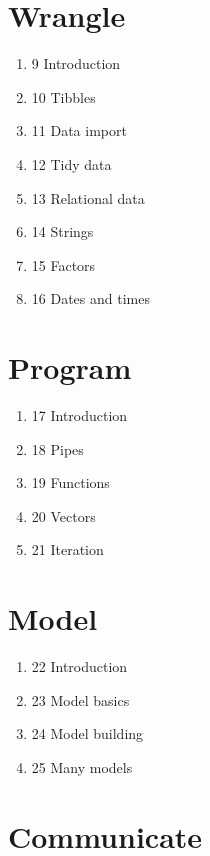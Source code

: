\documentclass[
]{book}
\providecommand{\tightlist}{%
  \setlength{\itemsep}{0pt}\setlength{\parskip}{0pt}}
\theoremstyle{definition}
\theoremstyle{definition}
\theoremstyle{definition}
\theoremstyle{definition}
\theoremstyle{remark}
\begin{document}
\hypertarget{wrangle}{%
\section{Wrangle}\label{wrangle}}

\begin{enumerate}
\def\labelenumi{\alph{enumi})}
\tightlist
\item
  9 Introduction
\item
  10 Tibbles
\item
  11 Data import
\item
  12 Tidy data
\item
  13 Relational data
\item
  14 Strings
\item
  15 Factors
\item
  16 Dates and times
\end{enumerate}

\hypertarget{program}{%
\section{Program}\label{program}}

\begin{enumerate}
\def\labelenumi{\alph{enumi})}
\tightlist
\item
  17 Introduction
\item
  18 Pipes
\item
  19 Functions
\item
  20 Vectors
\item
  21 Iteration
\end{enumerate}

\hypertarget{model}{%
\section{Model}\label{model}}

\begin{enumerate}
\def\labelenumi{\alph{enumi})}
\tightlist
\item
  22 Introduction
\item
  23 Model basics
\item
  24 Model building
\item
  25 Many models
\end{enumerate}

\hypertarget{communicate}{%
\section{Communicate}\label{communicate}}
\end{document}

